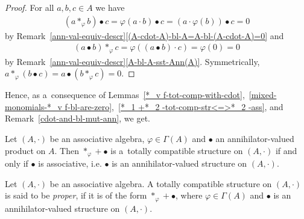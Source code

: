 \documentclass{jonasart}
\newcommand{\bl}{\bullet}
\newcommand{\G}{\Gamma}
\newcommand{\vf}{\varphi}
\begin{document}
	\begin{proof}
		For all $a,b,c\in A$ we have
		\begin{align*}
			(a*_\vf b)\bl c=\vf(a\cdot b)\bl c=(a\cdot\vf(b))\bl c=0
		\end{align*}
		by Remark~\ref{ann-val-equiv-descr}\eqref{(A-cdot-A)-bl-A=A-bl-(A-cdot-A)=0} and
		\begin{align*}
			(a\bl b)*_\vf c=\vf((a\bl b)\cdot c)=\vf(0)=0
		\end{align*}
		by Remark~\ref{ann-val-equiv-descr}\eqref{A-bl-A-sst-Ann(A)}. Symmetrically, $a*_\vf (b\bl c) = a\bl(b*_\vf c)=0$.
	\end{proof}

	Hence, as a~consequence of Lemmas~\ref{*_v f-tot-comp-with-cdot},~\ref{mixed-monomials-*_v f-bl-are-zero},~\ref{*_1 +*_2 -tot-comp-str<=>*_2 -ass}, and Remark~\ref{cdot-and-bl-mut-ann}, we get.
	\begin{corollary}
		Let $(A,\cdot)$ be an associative algebra, $\vf\in\G(A)$ and $\bl$ an annihilator-valued product on $A$. Then $*_\vf+\bl$ is a~totally compatible structure on $(A,\cdot)$ if and only if $\bl$ is associative, i.e. $\bl$ is an annihilator-valued structure on $(A,\cdot)$.
	\end{corollary}

	\begin{definition}\label{defn-proper-str}
		Let $(A,\cdot)$ be an associative algebra. A totally compatible structure on $(A,\cdot)$ is said to be \textit{proper}, if it is of the form $*_\vf+\bl$, where $\vf\in\G(A)$ and $\bl$ is an annihilator-valued structure on $(A,\cdot)$.
	\end{definition}
\end{document}
